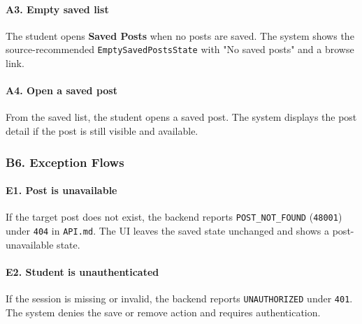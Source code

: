 \documentclass[12pt]{article}
\begin{document}
\hypertarget{sec:a3-empty-saved-list}{}
\paragraph*{A3. Empty saved list}
\par\medskip

The student opens \textbf{Saved Posts} when no posts are saved. The system shows the source-recommended \texttt{EmptySavedPostsState} with "No saved posts" and a browse link.
\par\medskip

\hypertarget{sec:a4-open-a-saved-post}{}
\paragraph*{A4. Open a saved post}
\par\medskip

From the saved list, the student opens a saved post. The system displays the post detail if the post is still visible and available.
\par\medskip

\hypertarget{sec:b6-exception-flows}{}
\subsubsection*{B6. Exception Flows}
\par\medskip

\hypertarget{sec:e1-post-is-unavailable}{}
\paragraph*{E1. Post is unavailable}
\par\medskip

If the target post does not exist, the backend reports \texttt{POST\_NOT\_FOUND} (\texttt{48001}) under \texttt{404} in \texttt{API.md}. The UI leaves the saved state unchanged and shows a post-unavailable state.
\par\medskip

\hypertarget{sec:e2-student-is-unauthenticated}{}
\paragraph*{E2. Student is unauthenticated}
\par\medskip

If the session is missing or invalid, the backend reports \texttt{UNAUTHORIZED} under \texttt{401}. The system denies the save or remove action and requires authentication.
\par\medskip
\end{document}
